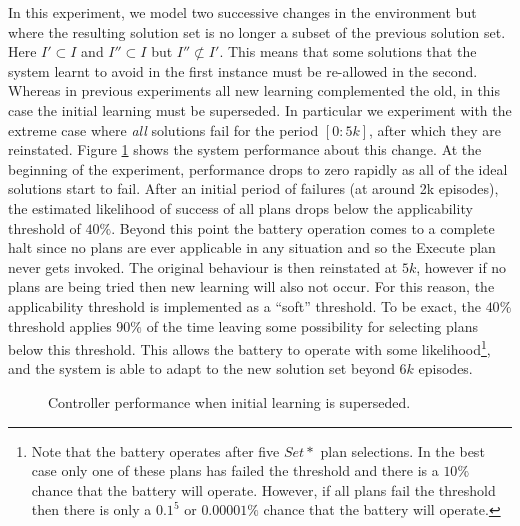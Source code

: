 In this experiment, we model two successive changes in the environment but where the resulting solution set is no longer a subset of the previous solution set. Here $I' \subset I$ and $I'' \subset I$ but $I'' \not\subset I'$. This means that some solutions that the system learnt to avoid in the first instance must be re-allowed in the second. Whereas in previous experiments all new learning complemented the old, in this case the initial learning must be superseded. In particular we experiment with the extreme case where {\em all} solutions fail for the period $[0:5k]$, after which they are reinstated. Figure \ref{fig:experiment3} shows the system performance about this change. At the beginning of the experiment, performance drops to zero rapidly as all of the ideal solutions start to fail. After an initial period of failures (at around 2k episodes), the estimated likelihood of success of all plans drops below the applicability threshold of $40\%$. Beyond this point the battery operation comes to a complete halt since no plans are ever applicable in any situation and so the Execute plan never gets invoked. The original behaviour is then reinstated at $5k$, however if no plans are being tried then new learning will also not occur. For this reason, the applicability threshold is implemented as a ``soft'' threshold. To be exact, the $40\%$ threshold applies $90\%$ of the time leaving some possibility for selecting plans below this threshold. This allows the battery to operate with some likelihood\footnote{Note that the battery operates after five $Set*$ plan selections. In the best case only one of these plans has failed the threshold and there is a $10\%$ chance that the battery will operate. However, if all plans fail the threshold then there is only a $0.1^5$ or $0.00001\%$ chance that the battery will operate.}, and the system is able to adapt to the new solution set beyond $6k$ episodes.


\begin{figure}[ht]
\begin{center}

\end{center}
\caption{Controller performance when initial learning is superseded.}
\label{fig:experiment3}
\end{figure}

